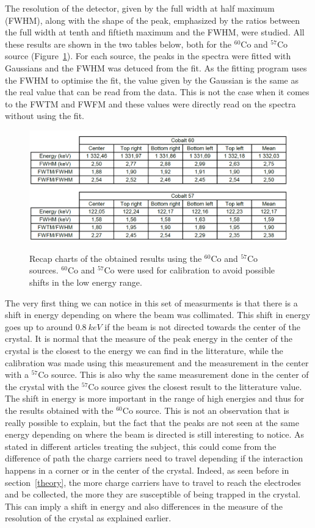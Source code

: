\documentclass[11pt,a4paper]{article}
\begin{document}
The resolution of the detector, given by the full width at half maximum (FWHM), along with the shape of the peak, emphasized by the ratios between the full width at tenth and fiftieth maximum and the FWHM, were studied. All these results are shown in the two tables below, both for the $^{60}$Co and $^{57}$Co source (Figure~\ref{recap}). For each source, the peaks in the spectra were fitted with Gaussians and the FWHM was detuced from the fit. As the fitting program uses the FWHM to optimise the fit, the value given by the Gaussian is the same as the real value that can be read from the data. This is not the case when it comes to the FWTM and FWFM and these values were directly read on the spectra without using the fit.

\begin{figure}[!h]
\centering
\caption{Recap charts of the obtained results using the $^{60}$Co and $^{57}$Co sources. $^{60}$Co and $^{57}$Co were used for calibration to avoid possible shifts in the low energy range.}
\includegraphics[scale=0.6]{Scan_Cos_2.png}
\label{recap}
\end{figure}

The very first thing we can notice in this set of measurments is that there is a shift in energy depending on where the beam was collimated. This shift in energy goes up to around $0.8~keV$ if the beam is not directed towards the center of the crystal. It is normal that the measure of the peak energy in the center of the crystal is the closest to the energy we can find in the litterature, while the calibration was made using this measurement and the measurement in the center with a $^{57}$Co source. This is also why the same measurement done in the center of the crystal with the $^{57}$Co source gives the closest result to the litterature value. The shift in energy is more important in the range of high energies and thus for the results obtained with the $^{60}$Co source. This is not an observation that is really possible to explain, but the fact that the peaks are not seen at the same energy depending on where the beam is directed is still interesting to notice. As stated in different articles treating the subject, this could come from the difference of path the charge carriers need to travel depending if the interaction happens in a corner or in the center of the crystal. Indeed, as seen before in section~\ref{theory}, the more charge carriers have to travel to reach the electrodes and be collected, the more they are susceptible of being trapped in the crystal. This can imply a shift in energy and also differences in the measure of the resolution of the crystal as explained earlier.
\end{document}
